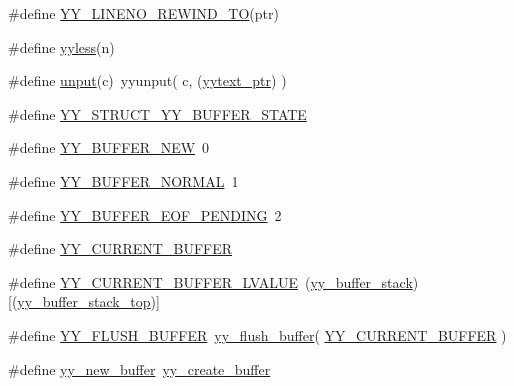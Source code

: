 \begin{DoxyCompactItemize}
\item 
\#define \hyperlink{_genesys_09_09-scanner_8cpp_a5206f64af3a299a0dc820c385cf0c489}{Y\-Y\-\_\-\-L\-I\-N\-E\-N\-O\-\_\-\-R\-E\-W\-I\-N\-D\-\_\-\-T\-O}(ptr)
\item 
\#define \hyperlink{_genesys_09_09-scanner_8cpp_ae65cb72d09db0abdc4b8e8c4d533ab14}{yyless}(n)
\item 
\#define \hyperlink{_genesys_09_09-scanner_8cpp_a448a4e9041a09588332733c6846c770c}{unput}(c)~yyunput( c, (\hyperlink{_genesys_09_09-scanner_8cpp_a790a191a93ef4d3b8c0bb43fd7480052}{yytext\-\_\-ptr})  )
\item 
\#define \hyperlink{_genesys_09_09-scanner_8cpp_a8aaa9e1fa7f13d6954d045ef973a9c84}{Y\-Y\-\_\-\-S\-T\-R\-U\-C\-T\-\_\-\-Y\-Y\-\_\-\-B\-U\-F\-F\-E\-R\-\_\-\-S\-T\-A\-T\-E}
\item 
\#define \hyperlink{_genesys_09_09-scanner_8cpp_a53579db42834b88199458993912c646d}{Y\-Y\-\_\-\-B\-U\-F\-F\-E\-R\-\_\-\-N\-E\-W}~0
\item 
\#define \hyperlink{_genesys_09_09-scanner_8cpp_a609d19f40900ecc2a5f812d9388c21fb}{Y\-Y\-\_\-\-B\-U\-F\-F\-E\-R\-\_\-\-N\-O\-R\-M\-A\-L}~1
\item 
\#define \hyperlink{_genesys_09_09-scanner_8cpp_ad689d97c15e807a6116ace7a420cea57}{Y\-Y\-\_\-\-B\-U\-F\-F\-E\-R\-\_\-\-E\-O\-F\-\_\-\-P\-E\-N\-D\-I\-N\-G}~2
\item 
\#define \hyperlink{_genesys_09_09-scanner_8cpp_aa093d500a6330d06d8e4760c494fac33}{Y\-Y\-\_\-\-C\-U\-R\-R\-E\-N\-T\-\_\-\-B\-U\-F\-F\-E\-R}
\item 
\#define \hyperlink{_genesys_09_09-scanner_8cpp_a817a6a24af62508b5a35f4bed5f56a2e}{Y\-Y\-\_\-\-C\-U\-R\-R\-E\-N\-T\-\_\-\-B\-U\-F\-F\-E\-R\-\_\-\-L\-V\-A\-L\-U\-E}~(\hyperlink{_genesys_09_09-scanner_8cpp_a34b6ab3a3061471b6604dba48e47a101}{yy\-\_\-buffer\-\_\-stack})\mbox{[}(\hyperlink{_genesys_09_09-scanner_8cpp_ae54779a12769204c826899d0531e40e6}{yy\-\_\-buffer\-\_\-stack\-\_\-top})\mbox{]}
\item 
\#define \hyperlink{_genesys_09_09-scanner_8cpp_ac5d478d90ea9a2ecd43d579067a2e89d}{Y\-Y\-\_\-\-F\-L\-U\-S\-H\-\_\-\-B\-U\-F\-F\-E\-R}~\hyperlink{_genesys_09_09-scanner_8cpp_a2f59cc88e85e5455c62e4ef7ce095ea8}{yy\-\_\-flush\-\_\-buffer}( \hyperlink{_genesys_09_09-scanner_8cpp_aa093d500a6330d06d8e4760c494fac33}{Y\-Y\-\_\-\-C\-U\-R\-R\-E\-N\-T\-\_\-\-B\-U\-F\-F\-E\-R} )
\item 
\#define \hyperlink{_genesys_09_09-scanner_8cpp_ab7eb911e18655f2f78e63afe5a8a4a12}{yy\-\_\-new\-\_\-buffer}~\hyperlink{_genesys_09_09-scanner_8cpp_a5bc6f1a5f7812508f425b08283f13ae8}{yy\-\_\-create\-\_\-buffer}

\end{DoxyCompactItemize}
